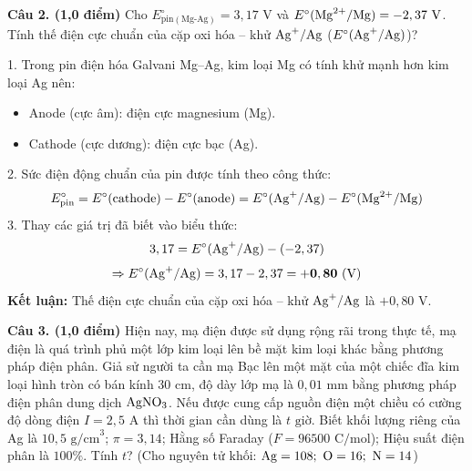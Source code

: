 \documentclass[11pt,a4paper]{article}
\begin{document}
\vspace{2pt}
\noindent
\textbf{Câu 2. (1,0 điểm)} Cho $E^\circ_{\text{pin}(\text{Mg-Ag})} = 3,17\text{ V}$ và $E^\circ(\ce{Mg^2+}/\ce{Mg}) = -2,37\text{ V}$. Tính thế điện cực chuẩn của cặp oxi hóa -- khử $\ce{Ag+}/\ce{Ag}$ ($E^\circ(\ce{Ag+}/\ce{Ag})$)?

\begin{tcolorbox}[colback=tableGreen!30,colframe=mainGreen!70,title=\textbf{Hướng dẫn giải chi tiết Câu 2},fonttitle=\bfseries]
1. Trong pin điện hóa Galvani Mg--Ag, kim loại Mg có tính khử mạnh hơn kim loại Ag nên:
\begin{itemize}[leftmargin=15pt,itemsep=1pt]
\item Anode (cực âm): điện cực magnesium (Mg).
\item Cathode (cực dương): điện cực bạc (Ag).
\end{itemize}
2. Sức điện động chuẩn của pin được tính theo công thức:
\[
E^\circ_\text{pin} = E^\circ(\text{cathode}) - E^\circ(\text{anode}) = E^\circ(\ce{Ag+}/\ce{Ag}) - E^\circ(\ce{Mg^2+}/\ce{Mg})
\]
3. Thay các giá trị đã biết vào biểu thức:
\[
3,17 = E^\circ(\ce{Ag+}/\ce{Ag}) - (-2,37)
\]
\[
\Rightarrow E^\circ(\ce{Ag+}/\ce{Ag}) = 3,17 - 2,37 = \mathbf{+0,80\text{ (V)}}
\]
\textbf{Kết luận:} Thế điện cực chuẩn của cặp oxi hóa -- khử $\ce{Ag+}/\ce{Ag}$ là $+0,80\text{ V}$.
\end{tcolorbox}

\vspace{2pt}
\noindent
\textbf{Câu 3. (1,0 điểm)} Hiện nay, mạ điện được sử dụng rộng rãi trong thực tế, mạ điện là quá trình phủ một lớp kim loại lên bề mặt kim loại khác bằng phương pháp điện phân. Giả sử người ta cần mạ Bạc lên một mặt của một chiếc đĩa kim loại hình tròn có bán kính $30\text{ cm}$, độ dày lớp mạ là $0,01\text{ mm}$ bằng phương pháp điện phân dung dịch $\ce{AgNO3}$. Nếu được cung cấp nguồn điện một chiều có cường độ dòng điện $I = 2,5\text{ A}$ thì thời gian cần dùng là $t\text{ giờ}$. Biết khối lượng riêng của Ag là $10,5\text{ g/cm}^3$; $\pi = 3,14$; Hằng số Faraday ($F = 96500\text{ C/mol}$); Hiệu suất điện phân là $100\%$. Tính $t$? (Cho nguyên tử khối: $\ce{Ag}=108;\ \ce{O}=16;\ \ce{N}=14$)
\end{document}
